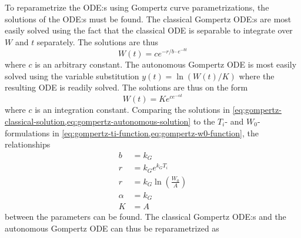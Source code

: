 To reparametrize the ODE:s using Gompertz curve parametrizations, the solutions of the ODE:s must be found.
The classical Gompertz ODE:s  are most easily solved using the fact that the classical ODE is separable to integrate over \(W\) and \(t\) separately.
The solutions are thus
\begin{equation} \label{eq:gompertz-classical-solution}
  W(t) = c e^{-r/b \cdot e^{-b t}}
\end{equation}
where \(c\) is an arbitrary constant.
The autonomous Gompertz ODE  is most easily solved using the variable substitution \(y(t) = \ln\left(W(t)/K\right)\) where the resulting ODE is readily solved.
The solutions are thus on the form
\begin{equation} \label{eq:gompertz-autonomous-solution}
  W(t) = K e^{c e^{-\alpha t}}
\end{equation}
where \(c\) is an integration constant.
Comparing the solutions in \cref{eq:gompertz-classical-solution,eq:gompertz-autonomous-solution} to the \(T_i\)- and \(W_0\)-formulations in \cref{eq:gompertz-ti-function,eq:gompertz-w0-function}, the relationships
\begin{align*}
  b &= k_G\\
  r &= k_G e^{k_G T_i}\\
  r &= k_G \ln\left(\frac{W_0}{A}\right)\\
  \alpha &= k_G\\
  K &= A
\end{align*}
between the parameters can be found.
The classical Gompertz ODE:s  and the autonomous Gompertz ODE  can thus be reparametrized as

